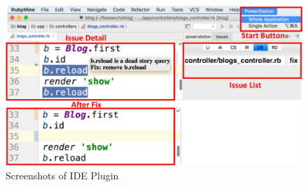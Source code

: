 \begin{figure}
\centering
\includegraphics[width=0.9\columnwidth]{figs/after.pdf}
\vspace{-0.1in}
\caption{Screenshots of \Tool IDE Plugin}
\label{fig:pw}

\vspace{-0.25in}
\end{figure}


